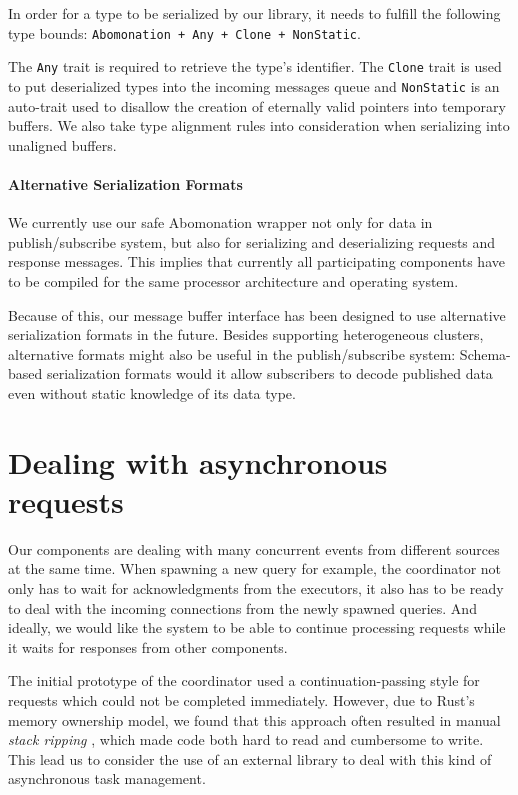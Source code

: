 In order for a type to be serialized by our library, it needs to fulfill the
following type bounds: \lstinline{Abomonation + Any + Clone + NonStatic}.

The \lstinline{Any} trait is required to retrieve the type's identifier. The
\lstinline{Clone} trait is used to put deserialized types into the incoming
messages queue and \lstinline{NonStatic} is an auto-trait used to disallow the
creation of eternally valid pointers into temporary buffers. We also take type
alignment rules into consideration when serializing into unaligned buffers. 

\paragraph{Alternative Serialization Formats}

We currently use our safe Abomonation wrapper not only for data in
publish/subscribe system, but also for serializing and deserializing requests
and response messages. This implies that currently all participating components
have to be compiled for the same processor architecture and operating system.

Because of this, our message buffer interface has been designed to use alternative
serialization formats in the future. Besides supporting heterogeneous clusters,
alternative formats might also be useful in the publish/subscribe system:
Schema-based serialization formats would it allow subscribers to decode published
data even without static knowledge of its data type.

\section{Dealing with asynchronous requests} \label{sec:futures}

Our components are dealing with many concurrent events from different sources
at the same time. When spawning a new query for example, the coordinator not
only has to wait for acknowledgments from the executors, it also has to be
ready to deal with the incoming connections from the newly spawned queries. And
ideally, we would like the system to be able to continue processing requests
while it waits for responses from other components.

The initial prototype of the coordinator used a continuation-passing style
for requests which could not be completed immediately. However, due to
Rust's memory ownership model, we found that this approach often resulted
in manual \emph{stack ripping} \cite{stackmgmt}, which made code both
hard to read and cumbersome to write. This lead us to consider the use of an
external library to deal with this kind of asynchronous task management.

